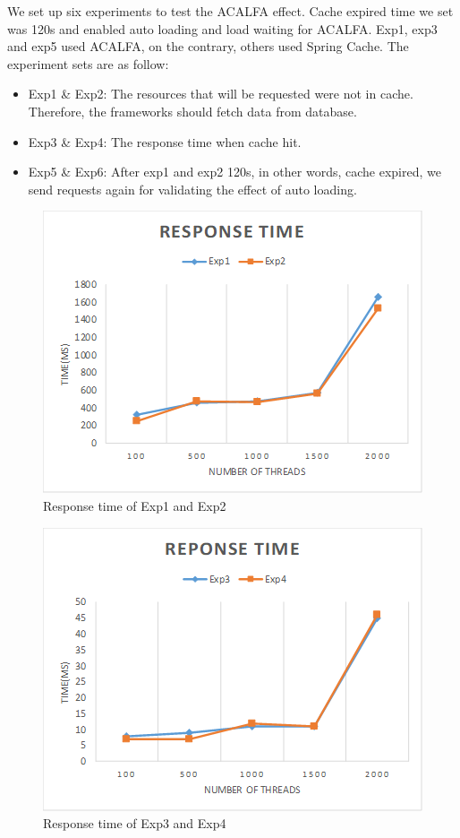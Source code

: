 \documentclass{singlecol-new}
\theoremstyle{TH}{
\newtheorem{lemma}{Lemma}
\newtheorem{theorem}[lemma]{Theorem}
\newtheorem{corrolary}[lemma]{Corrolary}
\newtheorem{conjecture}[lemma]{Conjecture}
\newtheorem{proposition}[lemma]{Proposition}
\newtheorem{claim}[lemma]{Claim}
\newtheorem{stheorem}[lemma]{Wrong Theorem}
}
\theoremstyle{THrm}{
\newtheorem{definition}{Definition}[section]
\newtheorem{question}{Question}[section]
\newtheorem{remark}{Remark}
\newtheorem{scheme}{Scheme}
}
\theoremstyle{THhit}{
\newtheorem{case}{Case}[section]
}
\begin{document}
We set up six experiments to test the ACALFA effect. Cache expired time we set was 120s and enabled auto loading and load waiting for ACALFA. Exp1, exp3 and exp5 used ACALFA, on the contrary, others used Spring Cache. The experiment sets are as follow:

\begin{itemize}
    \item Exp1 \& Exp2: The resources that will be requested were not in cache. Therefore, the frameworks should fetch data from database.
    \item Exp3 \& Exp4: The response time when cache hit.
    \item Exp5 \& Exp6: After exp1 and exp2 120s, in other words, cache expired, we send requests again for validating the effect of auto loading.
\end{itemize}

\begin{figure} [htb]
    \centering
    \includegraphics[width=1\linewidth]{img/exp1-2.png}
    \caption{Response time of Exp1 and Exp2}
    \label{exp1-2}
\end{figure}

\begin{figure} [htb]
    \centering
    \includegraphics[width=1\linewidth]{img/exp3-4.png}
    \caption{Response time of Exp3 and Exp4}
    \label{exp3-4}
\end{figure}
\end{document}
